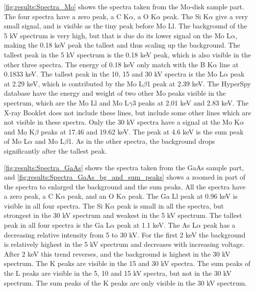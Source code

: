 \cref{fig:results:Spectra_Mo} shows the spectra taken from the Mo-disk sample part.
The four spectra have a zero peak, a C K$\alpha$, a O K$\alpha$ peak.
The Si K$\alpha$ give a very small signal, and is visible as the tiny peak before Mo Ll.
The background of the 5 kV spectrum is very high, but that is due do its lower signal on the Mo L$\alpha$, making the 0.18 keV peak the tallest and thus scaling up the background.
The tallest peak in the 5 kV spectrum is the 0.18 keV peak, which is also visible in the other three spectra.
The energy of 0.18 keV only match with the B K$\alpha$ line at 0.1833 keV. %
The tallest peak in the 10, 15 and 30 kV spectra is the Mo L$\alpha$ peak at 2.29 keV, which is contributed by the Mo L$\beta$1 peak at 2.39 keV.
The HyperSpy database have the energy and weight of two other Mo peaks visible in the spectrum, which are the Mo Ll and Mo L$\gamma$3 peaks at 2.01 keV and 2.83 keV.
The X-ray Booklet does not include these lines, but include some other lines which are not visible in these spectra.
Only the 30 kV spectra have a signal at the Mo K$\alpha$ and Mo K$\beta$ peaks at 17.46 and 19.62 keV. %
The peak at 4.6 keV is the sum peak of Mo L$\alpha$ and Mo L$\beta$1.
As in the other spectra, the background drops significantly after the tallest peak.




\cref{fig:results:Spectra_GaAs} shows the spectra taken from the GaAs sample part, and \cref{fig:results:Spectra_GaAs_bg_and_sum_peaks} shows a zoomed in part of the spectra to enlarged the background and the sum peaks.
All the spectra have a zero peak, a C K$\alpha$ peak, and an O K$\alpha$ peak.
The Ga Ll peak at 0.96 keV is visible in all four spectra.
The Si K$\alpha$ peak is small in all the spectra, but strongest in the 30 kV spectrum and weakest in the 5 kV spectrum.
The tallest peak in all four spectra is the Ga L$\alpha$ peak at 1.1 keV.
The As L$\alpha$ peak has a decreasing relative intensity from 5 to 30 kV.
For the first 2 keV the background is relatively highest in the 5 kV spectrum and decreases with increasing voltage.
After 2 keV this trend reverses, and the background is highest in the 30 kV spectrum. %
The K peaks are visible in the 15 and 30 kV spectra.
The sum peaks of the L peaks are visible in the 5, 10 and 15 kV spectra, but not in the 30 kV spectrum.
The sum peaks of the K peaks are only visible in the 30 kV spectrum. %


